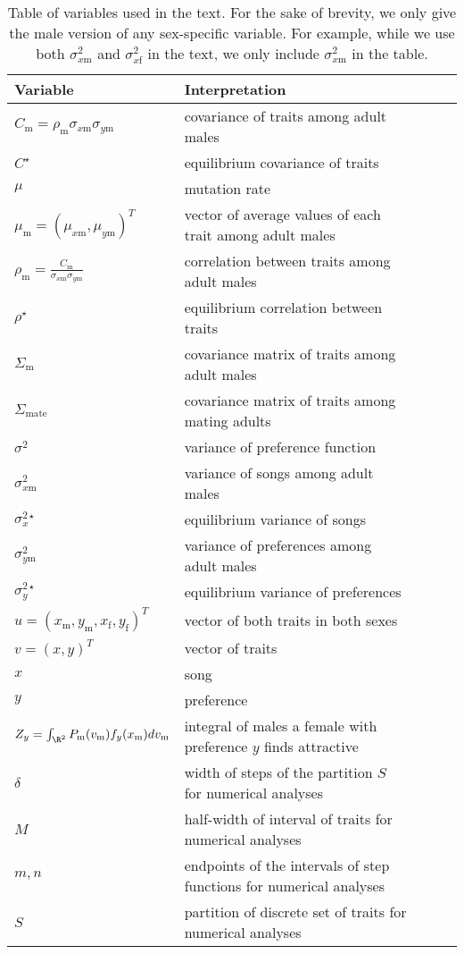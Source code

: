 \documentclass[12pt]{article}
\newcommand{\x}[1]{\text{#1}}
\begin{document}



\newpage

\begin{table}[tp]
\caption{\label{variables} Table of variables used in the text. For the sake of brevity, we only give the male version of any sex-specific variable. For example, while we use both $\sigma_{x\x{m}}^2$ and $\sigma_{x\x{f}}^2$ in the text, we only include $\sigma_{x\x{m}}^2$ in the table.}
\vspace{5pt}
\begin{tabular}{lllll}
Variable & Interpretation
\\\hline $C_\x{m}=\rho_\x{m}\sigma_{x\x{m}}\sigma_{y\x{m}}$ & covariance of traits among adult males
\\ $C^\star$ & equilibrium covariance of traits
\\ $\mu$ & mutation rate 
\\$\mu_\x{m}=(\mu_{x\x{m}},\mu_{y\x{m}})^T$ & vector of average values of each trait among adult males 
\\ $\rho_\x{m}=\frac{C_\x{m}}{\sigma_{x\x{m}}\sigma_{y\x{m}}}$ & correlation between traits among adult males
\\ $\rho^\star$ & equilibrium correlation between traits
\\$\Sigma_\x{m}$ & covariance matrix of traits among adult males
\\$\Sigma_\text{mate}$ & covariance matrix of traits among mating adults
\\$\sigma^2$ & variance of preference function
\\$\sigma_{x\x{m}}^2$ & variance of songs among adult males
\\$\sigma_{x}^{2\star}$ & equilibrium variance of songs
\\$\sigma_{y\x{m}}^2$ & variance of preferences among adult males
\\$\sigma_y^{2\star}$ & equilibrium variance of preferences
\\$u=(x_\x{m},y_\x{m},x_\x{f},y_\x{f})^T$ & vector of both traits in both sexes
\\$v=(x,y)^T$ & vector of traits
\\$x$ & song
\\$y$ & preference
\\$Z_y=\int_{\R^2}P_\x{m}(v_\x{m})f_{y}(x_\x{m})dv_\x{m}$ & integral of males a female with preference $y$ finds attractive
\\ $\delta$ & width of steps of the partition $S$ for numerical analyses
\\ $M$ & half-width of interval of traits for numerical analyses
\\$m,n$ & endpoints of the intervals of step functions for numerical analyses
\\ $S$ & partition of discrete set of traits for numerical analyses
\end{tabular}
\end{table}
\end{document}
